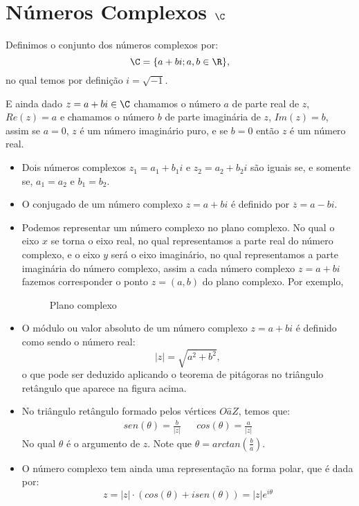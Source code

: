  \chapter{Números Complexos {$\C$}}

 \vskip0.3cm
 \colorbox{azul}{
 \begin{minipage}{14.5cm}
 \begin{center}
  Definimos o conjunto dos números complexos por:
 \[\C= \{a + bi; a, b \in \R \} ,\]
 no qual temos por definição $i= \sqrt{-1}$.
 \end{center}
 \end{minipage}}
 \vskip0.3cm

 E ainda dado $z= a+bi \in \C$ chamamos o número $a$ de parte real de $z$, $Re(z)= a$ e chamamos o número $b$ de parte imaginária de $z$, $Im(z)= b$, assim se $a=0$, $z$ é um número imaginário puro, e se $b=0$ então $z$ é um número real.

 \begin{defi}
 \begin{itemize}
 \item Dois números complexos $z_1= a_1 + b_1i$ e $z_2= a_2 + b_2i$ são iguais se, e somente se, $a_1=a_2$ e $b_1= b_2$.
 \item O conjugado de um número complexo $z= a+bi$ é definido por $\overline{z}= a - bi$.
 \item Podemos representar um número complexo no plano complexo. No qual o eixo $x$ se torna o eixo real, no qual representamos a parte real do número complexo, e o eixo $y$ será o eixo imaginário, no qual representamos a parte imaginária do número complexo, assim a cada número complexo $z= a+bi$ fazemos corresponder o ponto $z= (a, b)$ do plano complexo. Por exemplo,

 \begin{figure}[H]
   \centering
   \caption{Plano complexo}
  \end{figure}

 \item O módulo ou valor absoluto de um número complexo $z= a+bi$ é definido como sendo o número real:
 \[|z|= \sqrt{a^2 + b^2},\]
 o que pode ser deduzido aplicando o teorema de pitágoras no triângulo retângulo que aparece na figura acima.
 \item No triângulo retângulo formado pelos vértices $O\hat{a}Z$, temos que:
  \begin{align*}
 & sen(\theta)= \frac{b}{|z|} & & cos(\theta)= \frac{a}{|z|} &
 \end{align*}
 No qual $\theta$ é o argumento de $z$. Note que $\theta= arctan \left( \frac{b}{a} \right)$.

 \item O número complexo tem ainda uma representação na forma polar, que é dada por:
 \[z= |z|\cdot (cos(\theta) + i sen(\theta))= |z| e^{i \theta} \]

 \end{itemize}
 \end{defi}

